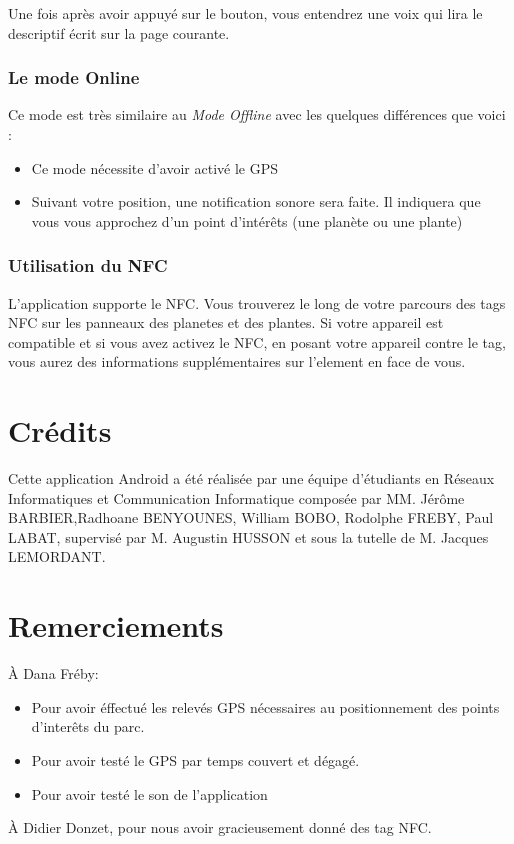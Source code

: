 \documentclass[a4paper,11pt]{article}
\begin{document}
    Une fois après avoir appuyé sur le bouton, vous entendrez une voix qui lira le descriptif écrit sur la page courante.
    
   \subsubsection{Le mode Online}
   Ce mode est très similaire au \textit{Mode Offline} avec les quelques différences que voici : 
   \begin{itemize}
    \item Ce mode nécessite d'avoir activé le GPS 
    \item Suivant votre position, une notification sonore sera faite. Il indiquera que vous vous approchez d'un point d'intérêts (une planète ou une plante)
   \end{itemize}

   \subsubsection*{Utilisation du NFC}
    L'application supporte le NFC. Vous trouverez le long de votre parcours des tags NFC sur les panneaux des planetes et des plantes.
      Si votre appareil est compatible et si vous avez activez le NFC, en posant votre appareil contre le tag, 
      vous aurez des informations supplémentaires sur l'element en face de vous.

   
    \section{Crédits}
    Cette application Android a été réalisée par une équipe d'étudiants en Réseaux Informatiques et Communication Informatique composée par 
    MM. Jérôme BARBIER,Radhoane BENYOUNES, William BOBO, Rodolphe FREBY, Paul LABAT, supervisé par M. Augustin HUSSON et sous la tutelle 
    de M. Jacques LEMORDANT.
    
    \section{Remerciements}
    À Dana Fréby:
    \begin{itemize}
     \item Pour avoir éffectué les relevés GPS nécessaires au positionnement des points d'interêts du parc.
     \item Pour avoir testé le GPS par temps couvert et dégagé. 
     \item Pour avoir testé le son de l'application
    \end{itemize}
    
  À Didier Donzet, pour nous avoir gracieusement donné des tag NFC.
\end{document}
